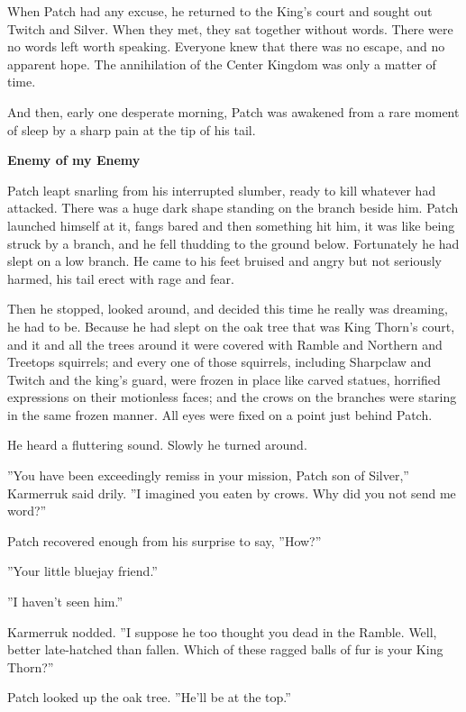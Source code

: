 \documentclass[11pt]{article}
\begin{document}
 When Patch had any excuse, he returned to the King's court and sought out Twitch and Silver. When they met, they sat together without words. There were no words left worth speaking. Everyone knew that there was no escape, and no apparent hope. The annihilation of the Center Kingdom was only a matter of time.\par
 And then, early one desperate morning, Patch was awakened from a rare moment of sleep by a sharp pain at the tip of his tail.\par
\par
{\bf Enemy of my Enemy\par
}\par
 Patch leapt snarling from his interrupted slumber, ready to kill whatever had attacked. There was a huge dark shape standing on the branch beside him. Patch launched himself at it, fangs bared %
 and then something hit him, it was like being struck by a branch, and he fell thudding to the ground below. Fortunately he had slept on a low branch. He came to his feet bruised and angry but not seriously harmed, his tail erect with rage and fear.\par
 Then he stopped, looked around, and decided this time he really was dreaming, he had to be. Because he had slept on the oak tree that was King Thorn's court, and it and all the trees around it were covered with Ramble and Northern and Treetops squirrels; and every one of those squirrels, including Sharpclaw and Twitch and the king's guard, were frozen in place like carved statues, horrified expressions on their motionless faces; and the crows on the branches were staring in the same frozen manner. All eyes were fixed on a point just behind Patch.\par
He heard a fluttering sound. Slowly he turned around.\par
 ''You have been exceedingly remiss in your mission, Patch son of Silver,'' Karmerruk said drily. ''I imagined you eaten by crows. Why did you not send me word?''\par
 Patch recovered enough from his surprise to say, ''How?''\par
 ''Your little bluejay friend.''\par
 ''I haven't seen him.''\par
 Karmerruk nodded. ''I suppose he too thought you dead in the Ramble. Well, better late-hatched than fallen. Which of these ragged balls of fur is your King Thorn?''\par
 Patch looked up the oak tree. ''He'll be at the top.''\par
\end{document}
